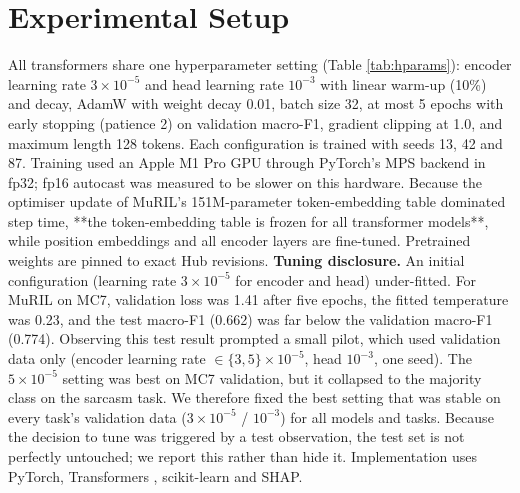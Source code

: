 \documentclass[10pt,twocolumn]{article}
\begin{document}
\section{Experimental Setup}

All transformers share one hyperparameter setting (Table \ref{tab:hparams}): encoder learning rate $3\times10^{-5}$ and
head learning rate $10^{-3}$ with linear warm-up (10\%) and decay, AdamW \cite{loshchilov2017adamw} with weight decay 0.01, batch size 32, at most 5 epochs with
early stopping (patience 2) on validation macro-F1, gradient clipping at 1.0, and maximum length 128 tokens. Each
configuration is trained with seeds 13, 42 and 87. Training used an Apple M1 Pro GPU through PyTorch's MPS backend in
fp32; fp16 autocast was measured to be slower on this hardware. Because the optimiser update of MuRIL's
151M-parameter token-embedding table dominated step time, **the token-embedding table is frozen for all transformer
models**, while position embeddings and all encoder layers are fine-tuned. Pretrained weights are pinned to exact Hub
revisions. \textbf{Tuning disclosure.} An initial configuration (learning rate $3\times10^{-5}$ for encoder and head)
under-fitted. For MuRIL on MC7, validation loss was 1.41 after five epochs, the fitted temperature was 0.23, and the
test macro-F1 (0.662) was far below the validation macro-F1 (0.774). Observing this test result prompted a small pilot,
which used validation data only (encoder learning rate $\in\{3,5\}\times10^{-5}$, head $10^{-3}$, one seed). The
$5\times10^{-5}$ setting was best on MC7 validation, but it collapsed to the majority class on the sarcasm task. We therefore
fixed the best setting that was stable on every task's validation data ($3\times10^{-5}$ / $10^{-3}$) for all models and
tasks. Because the decision to tune was triggered by a test
observation, the test set is not perfectly untouched; we report this rather than hide it. Implementation uses PyTorch, Transformers \cite{wolf2020transformers}, scikit-learn
\cite{pedregosa2011sklearn} and SHAP.
\end{document}
